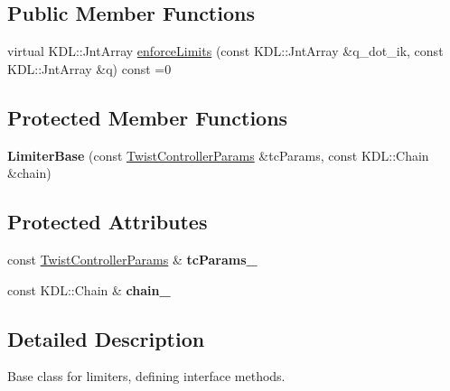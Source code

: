 \subsection*{Public Member Functions}
\begin{DoxyCompactItemize}
\item 
virtual K\-D\-L\-::\-Jnt\-Array \hyperlink{classLimiterBase_a1755edebc0cacfd79f945852ead8ae04}{enforce\-Limits} (const K\-D\-L\-::\-Jnt\-Array \&q\-\_\-dot\-\_\-ik, const K\-D\-L\-::\-Jnt\-Array \&q) const =0
\end{DoxyCompactItemize}
\subsection*{Protected Member Functions}
\begin{DoxyCompactItemize}
\item 
\hypertarget{classLimiterBase_abd32f319d44f38d5acdd40377c617ad9}{{\bfseries Limiter\-Base} (const \hyperlink{structTwistControllerParams}{Twist\-Controller\-Params} \&tc\-Params, const K\-D\-L\-::\-Chain \&chain)}\label{classLimiterBase_abd32f319d44f38d5acdd40377c617ad9}

\end{DoxyCompactItemize}
\subsection*{Protected Attributes}
\begin{DoxyCompactItemize}
\item 
\hypertarget{classLimiterBase_abc79fc6f46bd2d624434bff0f774c442}{const \hyperlink{structTwistControllerParams}{Twist\-Controller\-Params} \& {\bfseries tc\-Params\-\_\-}}\label{classLimiterBase_abc79fc6f46bd2d624434bff0f774c442}

\item 
\hypertarget{classLimiterBase_aa302d4220e371999c2e94cb020358cbd}{const K\-D\-L\-::\-Chain \& {\bfseries chain\-\_\-}}\label{classLimiterBase_aa302d4220e371999c2e94cb020358cbd}

\end{DoxyCompactItemize}


\subsection{Detailed Description}
Base class for limiters, defining interface methods. 

